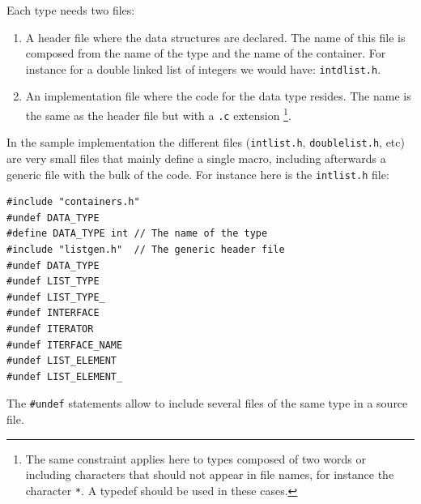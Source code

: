 \documentclass[12pt,a4paper]{memoir} %
\begin{document}
{{Each type needs two files:
\begin{enumerate}
\item A header file where the data structures are declared. The name of this file is composed from the name of the type and the name of the
container. For instance for a double linked list of integers we would have: \verb,intdlist.h,.
\item An implementation file where the code for the data type resides. The name is the same as the header file but with a \verb,.c, extension
\footnote{The same constraint applies here to types composed of two words or including characters that should not appear in file names, for instance 
the character \texttt{*}. A typedef should be used in these cases.}.
\end{enumerate}

In the sample implementation the different files (\verb,intlist.h,, \verb,doublelist.h,, etc) are very small files that mainly define a single macro, 
including afterwards a generic file with the bulk of the code. For instance here is the \verb,intlist.h, file:
\begin{verbatim}
#include "containers.h"
#undef DATA_TYPE
#define DATA_TYPE int // The name of the type
#include "listgen.h"  // The generic header file
#undef DATA_TYPE
#undef LIST_TYPE
#undef LIST_TYPE_
#undef INTERFACE
#undef ITERATOR
#undef ITERFACE_NAME
#undef LIST_ELEMENT
#undef LIST_ELEMENT_
\end{verbatim}
The \verb,#undef, statements allow to include several files of the same type in a source file.
}}
\end{document}

